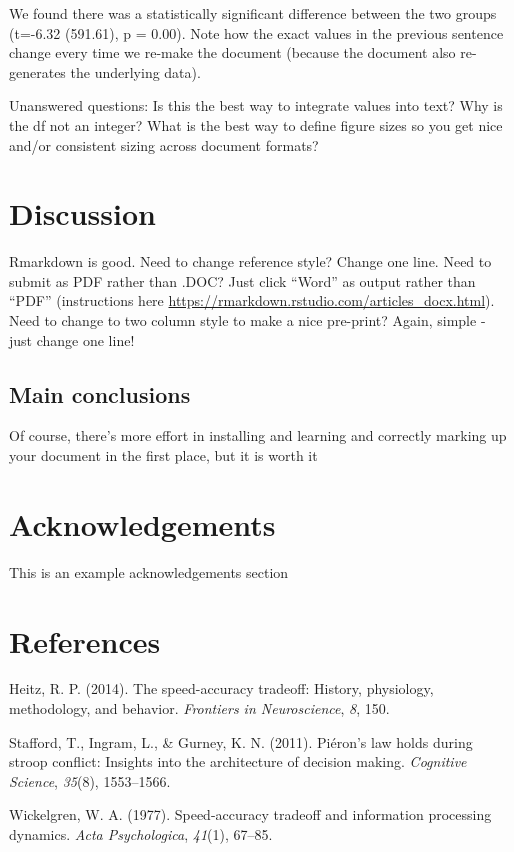 \documentclass[floatsintext,jou]{apa6}
\theoremstyle{definition}
\theoremstyle{definition}
\theoremstyle{definition}
\theoremstyle{remark}
\begin{document}
We found there was a statistically significant difference between the
two groups (t=-6.32 (591.61), p = 0.00). Note how the exact values in
the previous sentence change every time we re-make the document (because
the document also re-generates the underlying data).

Unanswered questions: Is this the best way to integrate values into
text? Why is the df not an integer? What is the best way to define
figure sizes so you get nice and/or consistent sizing across document
formats?

\section{Discussion}\label{discussion}

Rmarkdown is good. Need to change reference style? Change one line. Need
to submit as PDF rather than .DOC? Just click \enquote{Word} as output
rather than \enquote{PDF} (instructions here
\url{https://rmarkdown.rstudio.com/articles_docx.html}). Need to change
to two column style to make a nice pre-print? Again, simple - just
change one line!

\subsection{Main conclusions}\label{main-conclusions}

Of course, there's more effort in installing and learning and correctly
marking up your document in the first place, but it is worth it

\section{Acknowledgements}\label{acknowledgements}

This is an example acknowledgements section

\section*{References}\label{references}

\hypertarget{refs}{}
\hypertarget{ref-heitz2014speed}{}
Heitz, R. P. (2014). The speed-accuracy tradeoff: History, physiology,
methodology, and behavior. \emph{Frontiers in Neuroscience}, \emph{8},
150.

\hypertarget{ref-stafford2011pieron}{}
Stafford, T., Ingram, L., \& Gurney, K. N. (2011). Piéron's law holds
during stroop conflict: Insights into the architecture of decision
making. \emph{Cognitive Science}, \emph{35}(8), 1553--1566.

\hypertarget{ref-wickelgren1977speed}{}
Wickelgren, W. A. (1977). Speed-accuracy tradeoff and information
processing dynamics. \emph{Acta Psychologica}, \emph{41}(1), 67--85.
\end{document}
